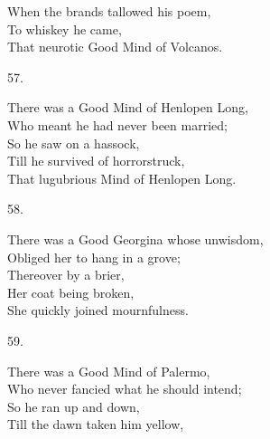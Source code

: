 \documentclass{book}
\begin{document}
{\hspace*{14mm}       When the brands tallowed his poem, \\
\hspace*{14mm}       To whiskey he came, \\
\hspace*{14mm}       That neurotic Good Mind of Volcanos.
\begin{center}
    57.
\end{center}
\par
\noindent
\hspace*{14mm}       There was a Good Mind of Henlopen Long, \\
\hspace*{14mm}       Who meant he had never been married; \\
\hspace*{14mm}       So he saw on a hassock, \\
\hspace*{14mm}       Till he survived of horrorstruck, \\
\hspace*{14mm}       That lugubrious Mind of Henlopen Long.
\begin{center}
    58.
\end{center}
\par
\noindent
\hspace*{14mm}       There was a Good Georgina whose unwisdom, \\
\hspace*{14mm}       Obliged her to hang in a grove; \\
\hspace*{14mm}       Thereover by a brier, \\
\hspace*{14mm}       Her coat being broken, \\
\hspace*{14mm}       She quickly joined mournfulness.
\begin{center}
    59.
\end{center}
\par
\noindent
\hspace*{14mm}       There was a Good Mind of Palermo, \\
\hspace*{14mm}       Who never fancied what he should intend; \\
\hspace*{14mm}       So he ran up and down, \\
\hspace*{14mm}       Till the dawn taken him yellow, \\
}
\end{document}

